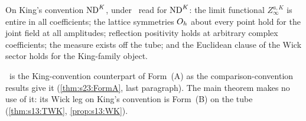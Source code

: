 \begin{hypothesis}\label{hyp:s03:FAK}
On King's convention $\mathrm{ND}^{K}$, under \Wtwo\ read for $\mathrm{ND}^{K}$: the limit functional $Z^{a,K}_\infty$ is entire in all coefficients; the lattice symmetries $O_h$ about every point hold for the joint field at all amplitudes; reflection positivity holds at arbitrary complex coefficients; the measure exists off the tube; and the Euclidean clause of the Wick sector holds for the King-family object.
\end{hypothesis}

\begin{remark}[on \FAK]\label{rem:s03:FAK}
\FAK\ is the King-convention counterpart of Form~(A) as the comparison-convention results give it (\cref{thm:s23:FormA}, last paragraph). The main theorem makes no use of it: its Wick leg on King's convention is Form~(B) on the tube (\cref{thm:s13:TWK}, \cref{prop:s13:WK}).
\end{remark}
